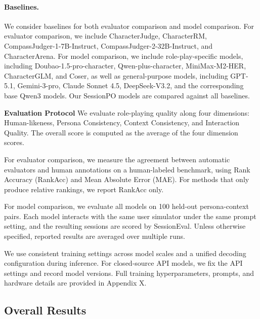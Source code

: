 \paragraph{Baselines. } 
We consider baselines for both evaluator comparison and model comparison. For evaluator comparison, we include CharacterJudge, CharacterRM, CompassJudger-1-7B-Instruct, CompassJudger-2-32B-Instruct, and CharacterArena. For model comparison, we include role-play-specific models, including Doubao-1.5-pro-character, Qwen-plus-character, MiniMax-M2-HER, CharacterGLM, and Coser, as well as general-purpose models, including GPT-5.1, Gemini-3-pro, Claude Sonnet 4.5, DeepSeek-V3.2, and the corresponding base Qwen3 models. Our SessionPO models are compared against all baselines.

\noindent\textbf{Evaluation Protocol} 
We evaluate role-playing quality along four dimensions: Human-likeness, Persona Consistency, Context Consistency, and Interaction Quality. The overall score is computed as the average of the four dimension scores.

For evaluator comparison, we measure the agreement between automatic evaluators and human annotations on a human-labeled benchmark, using Rank Accuracy (RankAcc) and Mean Absolute Error (MAE). For methods that only produce relative rankings, we report RankAcc only.

For model comparison, we evaluate all models on 100 held-out persona-context pairs. Each model interacts with the same user simulator under the same prompt setting, and the resulting sessions are scored by SessionEval. Unless otherwise specified, reported results are averaged over multiple runs.

We use consistent training settings across model scales and a unified decoding configuration during inference. For closed-source API models, we fix the API settings and record model versions. Full training hyperparameters, prompts, and hardware details are provided in Appendix X.





\subsection{Overall Results}


